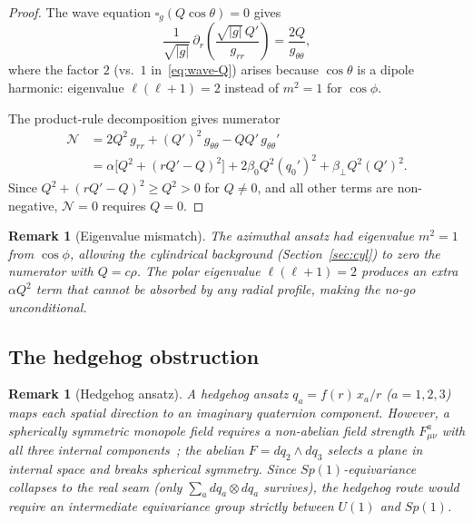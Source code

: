 \documentclass[pdflatex,sn-mathphys-num]{sn-jnl}
\theoremstyle{thmstyleone}%
\theoremstyle{thmstyletwo}%
\newtheorem{remark}[theorem]{Remark}
\theoremstyle{thmstylethree}%
\newcommand{\pa}{\partial}
\numberwithin{equation}{section}
\begin{document}
\begin{proof}
The wave equation $\square_g(Q\cos\theta) = 0$ gives
\begin{equation}
\label{eq:wave-polar}
\frac{1}{\sqrt{|g|}}\,\pa_r\!\left(
  \frac{\sqrt{|g|}\,Q'}{g_{rr}}\right)
= \frac{2Q}{g_{\theta\theta}},
\end{equation}
where the factor $2$ (vs.\ $1$ in~\eqref{eq:wave-Q}) arises
because $\cos\theta$ is a dipole harmonic: eigenvalue
$\ell(\ell+1) = 2$ instead of $m^2 = 1$ for $\cos\phi$.

The product-rule decomposition gives numerator
\begin{align*}
\mathcal{N}
&= 2Q^2\,g_{rr} + (Q')^2\,g_{\theta\theta}
   - QQ'\,g_{\theta\theta}' \\
&= \alpha\bigl[Q^2 + (rQ'-Q)^2\bigr]
 + 2\beta_0 Q^2(q_0')^2
 + \beta_\perp Q^2(Q')^2.
\end{align*}
Since $Q^2 + (rQ'-Q)^2 \ge Q^2 > 0$ for $Q\neq 0$, and all
other terms are non-negative, $\mathcal{N} = 0$ requires $Q = 0$.
\end{proof}

\begin{remark}[Eigenvalue mismatch]
\label{rem:polar-stronger}
The azimuthal ansatz had eigenvalue $m^2 = 1$ from $\cos\phi$,
allowing the cylindrical background
(Section~\ref{sec:cyl}) to zero the numerator with
$Q = c\rho$.  The polar eigenvalue $\ell(\ell+1) = 2$ produces
an extra $\alpha Q^2$ term that cannot be absorbed by any radial
profile, making the no-go unconditional.
\end{remark}

\subsection{The hedgehog obstruction}

\begin{remark}[Hedgehog ansatz]
\label{rem:hedgehog}
A \emph{hedgehog ansatz} $q_a = f(r)\,x_a/r$ ($a=1,2,3$)
maps each spatial direction to an imaginary quaternion component.
However, a spherically symmetric monopole field requires a
\emph{non-abelian} field strength $F^a_{\mu\nu}$ with all three
internal components~\cite{tHooft1974,Polyakov1974}; the abelian
$F = dq_2\wedge dq_3$ selects a plane in internal space and
breaks spherical symmetry.
Since $Sp(1)$-equivariance collapses to the real seam (only
$\sum_a dq_a\otimes dq_a$ survives), the hedgehog route would
require an intermediate equivariance group strictly between
$U(1)$ and $Sp(1)$.
\end{remark}
\end{document}
